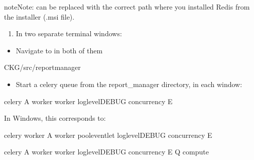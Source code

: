 \documentclass[letterpaper,10pt,english]{sphinxmanual}
\begin{document}
\begin{sphinxadmonition}{note}{Note:}
 can be replaced with the correct path where you installed Redis from the installer (.msi file).
\end{sphinxadmonition}
\begin{enumerate}
%
\setcounter{enumi}{1}
\item {} 
In two separate terminal windows:

\end{enumerate}
\begin{itemize}
\item {} 
Navigate to  in both of them

\end{itemize}

\begin{sphinxVerbatim}[commandchars=\\\{\}]
\PYGZdl{}  CKG/src/report\PYGZus{}manager
\end{sphinxVerbatim}
\begin{itemize}
\item {} 
Start a celery queue from the report\_manager directory, in each window:

\end{itemize}


\begin{sphinxVerbatim}[commandchars=\\\{\}]
\PYGZdl{} celery \PYGZhy{}A worker worker \PYGZhy{}\PYGZhy{}loglevelDEBUG \PYGZhy{}\PYGZhy{}concurrency \PYGZhy{}E
\end{sphinxVerbatim}

In Windows, this corresponds to:

\begin{sphinxVerbatim}[commandchars=\\\{\}]
\PYGZgt{} celery worker \PYGZhy{}A worker \PYGZhy{}\PYGZhy{}pooleventlet \PYGZhy{}\PYGZhy{}loglevelDEBUG \PYGZhy{}\PYGZhy{}concurrency \PYGZhy{}E
\end{sphinxVerbatim}


\begin{sphinxVerbatim}[commandchars=\\\{\}]
\PYGZdl{} celery \PYGZhy{}A worker worker \PYGZhy{}\PYGZhy{}loglevelDEBUG \PYGZhy{}\PYGZhy{}concurrency \PYGZhy{}E \PYGZhy{}Q compute
\end{sphinxVerbatim}
\end{document}
